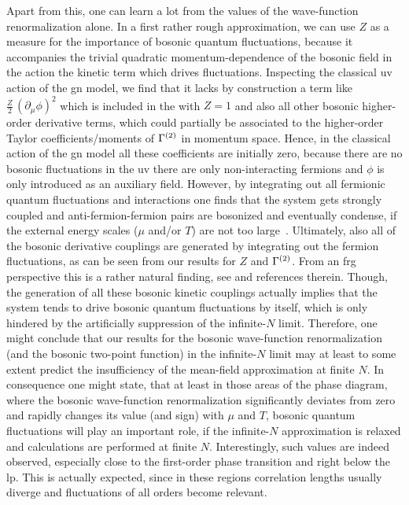 Apart from this, one can learn a lot from the values of the wave-function renormalization alone.	
In a first rather rough approximation, we can use $Z$ as a measure for the importance of bosonic quantum fluctuations, because it accompanies the trivial quadratic momentum-dependence of the bosonic field in the action \dash{} the kinetic term \dash{} which drives fluctuations.
Inspecting the classical \gls{uv} action of the \gls{gn} model, we find that it lacks by construction a term like $\frac{Z}{2} \, ( \partial_\mu \phi )^2$ \dash{} which is included in the \gnym{} with $Z=1$ \dash{} and also all other bosonic higher-order derivative terms, which could partially be associated to the higher-order Taylor coefficients/moments of $\Gamma^{(2)}$ in momentum space.
Hence, in the classical action of the \gls{gn} model all these coefficients are initially zero, because there are no bosonic fluctuations in the \gls{uv} \dash{} there are only non-interacting fermions \dash{} and $\phi$ is only introduced as an auxiliary field.
However, by integrating out all fermionic quantum fluctuations and interactions one finds that the system gets strongly coupled and anti-fermion-fermion pairs are bosonized and eventually condense, if the external energy scales ($\mu$ and/or $T$) are not too large~\cite{Wolff:1985av,Harrington:1974tf,Dashen:1974xz}.
Ultimately, also all of the bosonic derivative couplings are generated by integrating out the fermion fluctuations, as can be seen from our results for $Z$ and $\Gamma^{(2)}$.
From an \gls{frg} perspective this is a rather natural finding, see  and references therein.
Though, the generation of all these bosonic kinetic couplings actually implies that the system tends to drive bosonic quantum fluctuations by itself, which is only hindered by the artificially suppression of the infinite-$N$ limit.
Therefore, one might conclude that our results for the bosonic wave-function renormalization (and the bosonic two-point function) in the infinite-$N$ limit may \dash{} at least to some extent \dash{} predict the insufficiency of the mean-field approximation at finite $N$. 
In consequence one might state, that at least in those areas of the phase diagram, where the bosonic wave-function renormalization significantly deviates from zero and rapidly changes its value (and sign) with $\mu$ and $T$, bosonic quantum fluctuations will play an important role, if the infinite-$N$ approximation is relaxed and calculations are performed at finite $N$.
Interestingly, such values are indeed observed, especially close to the first-order phase transition and right below the \gls{lp}.
This is actually expected, since in these regions correlation lengths usually diverge and fluctuations of all orders become relevant.

